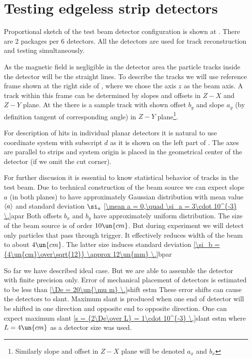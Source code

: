 \section{Testing edgeless strip detectors}

Proportional sketch of the test beam detector configuration is shown at \fg{} . There are 2 packages per 6 detectors. All the detectors are used for track reconstruction and testing simultaneously.


As the magnetic field is negligible in the detector area the particle tracks inside the detector will be the straight lines. To describe the tracks we will use reference frame shown at the right side of \fg{} , where we chose the axis $z$ as the beam axis. A track within this frame can be determined by slopes and offsets in $Z-X$ and $Z-Y$ plane. At the \fg{}  there is a sample track with shown offset $b_y$ and slope $a_y$ (by definition tangent of corresponding angle) in $Z-Y$ plane\footnote{Similarly slope and offset in $Z-X$ plane will be denoted $a_x$ and $b_x$}.


For description of hits in individual planar detectors it is natural to use coordinate system with subscript $d$ as it is shown on the left part of \fg{} . The axes are parallel to strips and system origin is placed in the geometrical center of the detector (if we omit the cut corner).

For further discusion it is essential to know statistical behavior of tracks in the test beam. Due to technical construction of the beam source we can expect slope $a$ (in both planes)
to have approximately Gaussian distribution with mean value $\left\langle a\right\rangle$ and standard deviation $\si_a$
\eqref{\mean a = 0,\quad \si_a = 3\cdot 10^{-3} \.}{apar}
Both offsets $b_x$ and $b_y$ have approximately uniform distribution. The size of the beam source is of order $10\un{cm}$. But during experiment we
will detect only particles that pass through trigger. It effectively reduces width of the beam to about $4\un{cm}$. The latter
size induces standard deviation
\eqref{\si_b = {4\un{cm}\over\sqrt{12}} \approx 12\un{mm} \.}{bpar}

So far we have described ideal case. But we are able to assemble the detector with finite precision only.
Error of mechanical placement of detectors is estimated to be less than
\eqref{\De = 20\un{\mu m} \.}{shift estm}
These error shifts can cause the detectors to slant. Maximum slant is produced when one end of
detector will be shifted in one direction and opposite end to opposite direction. One can expect maximum
slant
\eqref{s = {2\De\over L} = 1\cdot 10^{-3} \,}{slant estm}
where $L = 4\un{cm}$ as a detector size was used.




